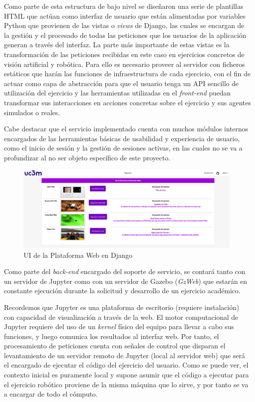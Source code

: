 Como parte de esta estructura de bajo nivel se diseñaron una serie de plantillas HTML que actúan como interfaz de usuario que están alimentadas por variables Python que provienen de las vistas o \textit{views} de Django, las cuales se encargan de la gestión y el procesado de todas las peticiones que los usuarios de la aplicación generan a través del interfaz. La parte más importante de estas vistas es la transformación de las peticiones recibidas en este caso en ejercicios concretos de visión artificial y robótica. Para ello es necesario proveer al servidor con ficheros estáticos que harán las funciones de infraestructura de cada ejercicio, con el fin de actuar como capa de abstracción para que el usuario tenga un API sencillo de utilización del ejercicio y las herramientas utilizadas en el \textit{front-end} puedan transformar sus interacciones en acciones concretas sobre el ejercicio y sus agentes simulados o reales.

Cabe destacar que el servicio implementado cuenta con muchos módulos internos encargados de las herramientas básicas de usabilidad y experiencia de usuario, como el inicio de sesión y la gestión de sesiones activas, en las cuales no se va a profundizar al no ser objeto específico de este proyecto.

\begin{figure}[!hbtp]  \centering\noindent
    \includegraphics[width=0.99\textwidth]{figures/app_ui.png}
    \caption{UI de la Plataforma Web en Django}
    \label{appui}
\end{figure}

Como parte del \textit{back-end} encargado del soporte de servicio, se contará tanto con un servidor de Jupyter como con un servidor de Gazebo (\textit{GzWeb}) que estarán en constante ejecución durante la solicitud y desarrollo de un ejercicio académico. 

Recordemos que Jupyter es una plataforma de escritorio (requiere instalación) con capacidad de visualización a través de la web. El motor computacional de Jupyter requiere del uso de un \textit{kernel} físico del equipo para llevar a cabo sus funciones, y luego comunica los resultados al interfaz web. Por tanto, el procesamiento de peticiones cuenta con señales de control que disparan el levantamiento de un servidor remoto de Jupyter (local al servidor web) que será el encargado de ejecutar el código del ejercicio del usuario.  Como se puede ver, el contexto inicial es puramente local y supone asumir que el código a ejecutar para el ejercicio robótico proviene de la misma máquina que lo sirve, y por tanto se va a encargar de todo el cómputo. 

